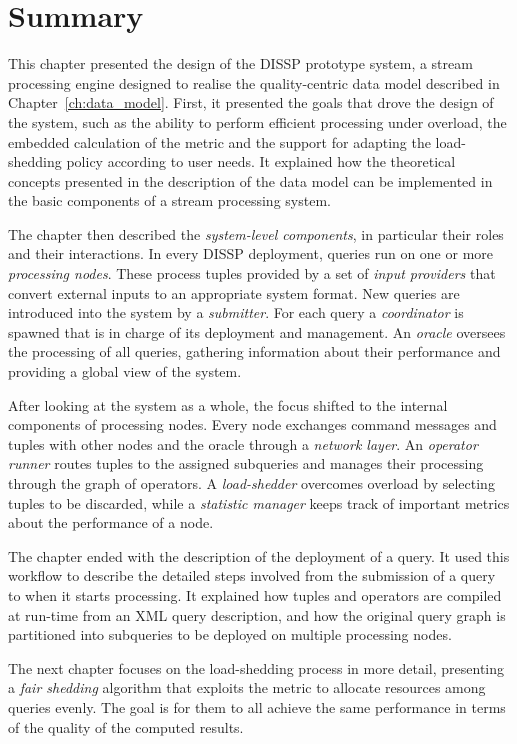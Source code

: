 \section{Summary}
This chapter presented the design of the DISSP prototype system, a stream processing engine designed to
realise the quality-centric data model described in Chapter~\ref{ch:data_model}.
First, it presented the goals that drove the design of the system, such as the ability to perform
efficient processing under overload, the embedded calculation of the \sic metric and the support for
adapting the \mbox{load-shedding} policy according to user needs.
It explained how the theoretical concepts presented in the description of the data model
can be implemented in the basic components of a stream processing system.

The chapter then described the \emph{system-level components}, in particular their roles
and their interactions. In every DISSP deployment, queries run on one or more \emph{processing
nodes}. These process tuples provided by a set of \emph{input providers} that
convert external inputs to an appropriate system format. New queries are introduced into the system by a
\emph{submitter}. For each query a \emph{coordinator} is spawned that is in charge of its deployment
and management. An \emph{oracle} oversees the processing of all queries, gathering information about
their performance and providing a global view of the system.

After looking at the system as a whole, the focus shifted to the internal components of processing
nodes. Every node exchanges command messages and tuples with other nodes and the oracle through a
\emph{network layer}. An \emph{operator runner} routes tuples to the assigned subqueries
and manages their processing through the graph of operators. A \emph{load-shedder}
overcomes overload by selecting tuples to be discarded, while a \emph{statistic manager} keeps
track of important metrics about the performance of a node.

The chapter ended with the description of the deployment of a query. It used this workflow to
describe the detailed steps involved from the submission of a query to when it
starts processing.
It explained how tuples and operators are compiled at run-time from an XML query description, and how
the original query graph is partitioned into subqueries to be deployed on multiple processing nodes.

The next chapter focuses on the load-shedding process in more detail, presenting a \emph{fair
shedding} algorithm that exploits the \sic metric to allocate resources among queries evenly. 
The goal is for them to all achieve the same performance in terms of the quality of the computed results.